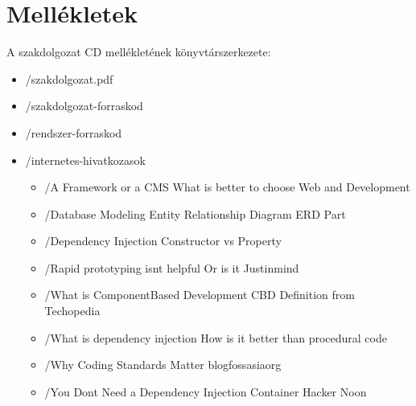 \documentclass[a4paper,12pt,oneside]{report}
\begin{document}
\newpage
\thispagestyle{empty}
\section*{Mellékletek}

A szakdolgozat CD mellékletének könyvtárszerkezete:

\begin{itemize}
	\item[] /szakdolgozat.pdf
	\item[] /szakdolgozat-forraskod
	\item[] /rendszer-forraskod
	\item[] /internetes-hivatkozasok
		\begin{itemize}
            \item[] /A Framework or a CMS What is better to choose Web and Development
            \item[] /Database Modeling Entity Relationship Diagram ERD Part 
            \item[] /Dependency Injection Constructor vs Property
            \item[] /Rapid prototyping isnt helpful Or is it Justinmind
            \item[] /What is ComponentBased Development CBD Definition from Techopedia
            \item[] /What is dependency injection How is it better than procedural code
            \item[] /Why Coding Standards Matter blogfossasiaorg
            \item[] /You Dont Need a Dependency Injection Container Hacker Noon
		\end{itemize}
\end{itemize}
\end{document}
